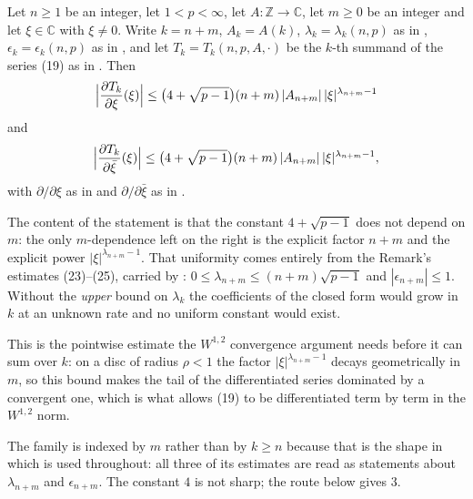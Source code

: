 \begin{helper}
Let $n\ge1$ be an integer, let $1<p<\infty$, let
$A\colon\mathbb{Z}\to\mathbb{C}$, let $m\ge0$ be an integer and let
$\xi\in\mathbb{C}$ with $\xi\ne0$.  Write $k=n+m$, $A_k=A(k)$,
$\lambda_k=\lambda_k(n,p)$ as in ,
$\epsilon_k=\epsilon_k(n,p)$ as in , and let
$T_k=T_k(n,p,A,\cdot)$ be the $k$-th summand of the series (19) as in
.  Then
\[
  \Bigl|\frac{\partial T_k}{\partial\xi}(\xi)\Bigr|
  \le\bigl(4+\sqrt{p-1}\bigr)(n+m)\,|A_{n+m}|\,|\xi|^{\lambda_{n+m}-1}
\]
and
\[
  \Bigl|\frac{\partial T_k}{\partial\bar\xi}(\xi)\Bigr|
  \le\bigl(4+\sqrt{p-1}\bigr)(n+m)\,|A_{n+m}|\,|\xi|^{\lambda_{n+m}-1},
\]
with $\partial/\partial\xi$ as in  and $\partial/\partial\bar\xi$
as in .

The content of the statement is that the constant $4+\sqrt{p-1}$ does not
depend on $m$: the only $m$-dependence left on the right is the explicit
factor $n+m$ and the explicit power $|\xi|^{\lambda_{n+m}-1}$.  That
uniformity comes entirely from the Remark's estimates (23)--(25), carried by
: $0\le\lambda_{n+m}\le(n+m)\sqrt{p-1}$ and
$|\epsilon_{n+m}|\le1$.  Without the \emph{upper} bound on $\lambda_k$ the
coefficients of the closed form would grow in $k$ at an unknown rate and no
uniform constant would exist.

This is the pointwise estimate the $W^{1,2}$ convergence argument needs before
it can sum over $k$: on a disc of radius $\rho<1$ the factor
$|\xi|^{\lambda_{n+m}-1}$ decays geometrically in $m$, so this bound makes the
tail of the differentiated series dominated by a convergent one, which is what
allows (19) to be differentiated term by term in the $W^{1,2}$ norm.

The family is indexed by $m$ rather than by $k\ge n$ because that is the shape
in which  is used throughout: all three of its
estimates are read as statements about $\lambda_{n+m}$ and $\epsilon_{n+m}$.
The constant $4$ is not sharp; the route below gives $3$.
\end{helper}
